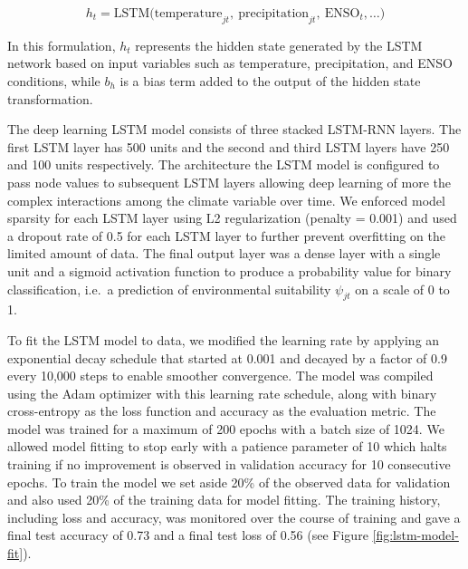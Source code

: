 \documentclass[
]{book}
\begin{document}
\begin{equation}
h_t = \text{LSTM}\big(\text{temperature}_{jt}, \ \text{precipitation}_{jt}, \ \text{ENSO}_{t}, \dots \big)
\end{equation}

In this formulation, \(h_t\) represents the hidden state generated by the LSTM network based on input variables such as temperature, precipitation, and ENSO conditions, while \(b_h\) is a bias term added to the output of the hidden state transformation.

The deep learning LSTM model consists of three stacked LSTM-RNN layers. The first LSTM layer has 500 units and the second and third LSTM layers have 250 and 100 units respectively. The architecture the LSTM model is configured to pass node values to subsequent LSTM layers allowing deep learning of more the complex interactions among the climate variable over time. We enforced model sparsity for each LSTM layer using L2 regularization (penalty = 0.001) and used a dropout rate of 0.5 for each LSTM layer to further prevent overfitting on the limited amount of data. The final output layer was a dense layer with a single unit and a sigmoid activation function to produce a probability value for binary classification, i.e.~a prediction of environmental suitability \(\psi_{jt}\) on a scale of 0 to 1.

To fit the LSTM model to data, we modified the learning rate by applying an exponential decay schedule that started at 0.001 and decayed by a factor of 0.9 every 10,000 steps to enable smoother convergence. The model was compiled using the Adam optimizer with this learning rate schedule, along with binary cross-entropy as the loss function and accuracy as the evaluation metric. The model was trained for a maximum of 200 epochs with a batch size of 1024. We allowed model fitting to stop early with a patience parameter of 10 which halts training if no improvement is observed in validation accuracy for 10 consecutive epochs. To train the model we set aside 20\% of the observed data for validation and also used 20\% of the training data for model fitting. The training history, including loss and accuracy, was monitored over the course of training and gave a final test accuracy of 0.73 and a final test loss of 0.56 (see Figure \ref{fig:lstm-model-fit}).
\end{document}
